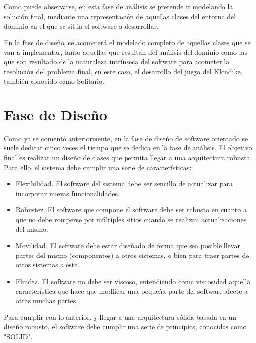 \documentclass[11pt]{article}
\begin{document}
\begin{itemize}
Como puede observarse, en esta fase de análisis se pretende ir modelando la solución final, mediante una representación de aquellas clases del entorno del dominio en el que se sitúa el software a desarrollar.

En la fase de diseño, se acometerá el modelado completo de aquellas clases que se van a implementar, tanto aquellas que resultan del análisis del dominio como las que son resultado de la naturaleza intrínseca del software para acometer la resolución del problema final, en este caso, el desarrollo del juego del Klondike, también conocido como Solitario.
\end{itemize}

\pagebreak

\section{Fase de Diseño}

Como ya se comentó anteriormente, en la fase de diseño de software orientado se suele dedicar cinco veces el tiempo que se dedica en la fase de análisis. El objetivo final es realizar un diseño de clases que permita llegar a una arquitectura robusta. Para ello, el sistema debe cumplir una serie de características:

\begin{itemize}
\item{Flexibilidad}. El software del sistema debe ser sencillo de actualizar para incorporar nuevas funcionalidades.
\item{Robustez}. El software que compone el software debe ser robusto en cuanto a que no debe romperse por múltiples sitios cuando se realizan actualizaciones del mismo.
\item{Movilidad}. El software debe estar diseñado de forma que sea posible llevar partes del mismo (componentes) a otros sistemas, o bien para traer partes de otros sistemas a éste.
\item{Fluidez}. El software no debe ser viscoso, entendiendo como viscosidad aquella característica que hace que modficar una pequeña parte del software afecte a otras muchas partes.
\end{itemize}

Para cumplir con lo anterior, y llegar a una arquitectura sólida basada en un diseño robusto, el software debe cumplir una serie de principios, conocidos como "SOLID".
\end{document}
